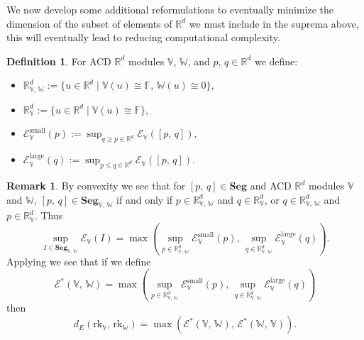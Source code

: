 \documentclass[a4paper,UKenglish,thm-restate]{article}
\theoremstyle{definition}
\newtheorem{definition}[theorem]{Definition}
\newtheorem{remark}[theorem]{Remark}
\begin{document}
            We now develop some additional reformulations to eventually minimize the dimension of the subset of elements of $\mathbb{R}^d$ we must include in the suprema above, this will eventually lead to reducing computational complexity.
            \begin{definition} \label{dEshiftdef}
                For ACD $\mathbb{R}^d$ modules $\mathbb{V}$, $\mathbb{W}$, and $p,\,q\in\mathbb{R}^d$ we define:
                \begin{itemize}
                    \item $\mathbb{R}^d_{\mathbb{V},\,\mathbb{W}}:=\{u\in\mathbb{R}^d\;|\;\mathbb{V}(u)\cong\mathbb{F},\,\mathbb{W}(u)\cong0\},$

                    \item $\mathbb{R}^d_{\mathbb{V}}:=\{u\in\mathbb{R}^d\;|\;\mathbb{V}(u)\cong\mathbb{F}\},$

                    \item $\mathcal{E}^\text{small}_\mathbb{V}(p):=\sup_{q\geq p\in{\mathbb{R}^d}}\mathcal{E}_\mathbb{V}([p,\,q]),$

                    \item $\mathcal{E}^\text{large}_\mathbb{V}(q):=\sup_{p\leq q\in{\mathbb{R}^d}}\mathcal{E}_\mathbb{V}([p,\,q]).$
                \end{itemize}
            \end{definition}
            \begin{remark}\label{dEcubic}
                By convexity we see that for $[p,\,q]\in\mathbf{Seg}$ and ACD $\mathbb{R}^d$ modules $\mathbb{V}$ and $\mathbb{W}$, $[p,\,q]\in\mathbf{Seg}_{\mathbb{V},\,\mathbb{W}}$ if and only if $p\in\mathbb{R}^d_{\mathbb{V},\,\mathbb{W}}$ and $q\in\mathbb{R}^d_\mathbb{V}$, or $q\in\mathbb{R}^d_{\mathbb{V},\,\mathbb{W}}$ and $p\in\mathbb{R}^d_\mathbb{V}$. Thus \[\sup_{I\in\mathbf{Seg}_{\mathbb{V},\,\mathbb{W}}}\mathcal{E}_{\mathbb{V}}(I)=\max\left(\sup_{p\in\mathbb{R}^d_{\mathbb{V},\,\mathbb{W}}}\mathcal{E}^\text{small}_\mathbb{V}(p),\,\sup_{q\in\mathbb{R}^d_{\mathbb{V},\,\mathbb{W}}}\mathcal{E}^\text{large}_\mathbb{V}(q)\right).\] Applying  we see that if we define
                \[
                    \mathcal{E}^\ast(\mathbb{V},\,\mathbb{W})=\max\left(\sup_{p\in\mathbb{R}^d_{\mathbb{V},\,\mathbb{W}}}\mathcal{E}^\text{small}_\mathbb{V}(p),\,\sup_{q\in\mathbb{R}^d_{\mathbb{V},\,\mathbb{W}}}\mathcal{E}^\text{large}_\mathbb{V}(q)\right)
                \]
                then 
                \[    d_E(\mathrm{rk}_\mathbb{V},\,\mathrm{rk}_\mathbb{W})=\max\left(\mathcal{E}^\ast(\mathbb{V},\,\mathbb{W}),\,\mathcal{E}^\ast(\mathbb{W},\,\mathbb{V})\right).
                \]
            \end{remark}
            
\end{document}
